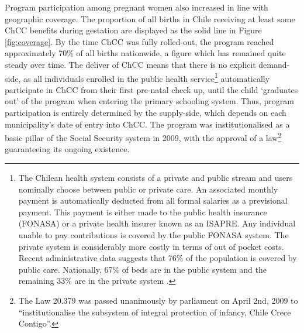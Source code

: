 \documentclass[12pt]{article}
\begin{document}
\begin{spacing}{1.4}
Program participation
among pregnant women also increased in line with geographic coverage.  
The proportion of all births in Chile receiving at least some ChCC
benefits during gestation are displayed as the solid line in Figure
\ref{fig:coverage}.  By the time ChCC was fully rolled-out, the
program reached approximately 70\% of all births nationwide, a figure
which has remained quite steady over time.  The deliver of ChCC
means that there is no explicit demand-side, as all individuals
enrolled in the public health service\footnote{The Chilean health system
  consists of a private and public stream and users nominally choose
  between public or private care. An associated monthly payment is
  automatically deducted from all formal salaries as a previsional payment.
  This payment is either made to the public health insurance (FONASA) or
  a private health insurer known as an ISAPRE.  Any individual unable to
  pay contributions is covered by the public FONASA system.  The private
  system is considerably more costly in terms of out of pocket costs.
  Recent administrative data suggests that 76\% of the population is
  covered by public care.  Nationally, 67\% of beds are in the public
  system and the remaining 33\% are in the private system \citep{DEIS2016}.}
automatically participate in ChCC from their first pre-natal check up,
until the child `graduates out' of the program when entering the primary
schooling system.  Thus, program participation is entirely determined
by the supply-side, which depends on each municipality's date of entry
into ChCC.  The program was institutionalised as a basic pillar of the
Social Security system in 2009, with the approval of a law\footnote{The
  Law 20.379 was passed unanimously by parliament on April 2nd, 2009 to
  ``institutionalise the subsystem of integral protection of infancy,
  Chile Crece Contigo''.} guaranteeing its ongoing existence.



\end{spacing}
\end{document}
